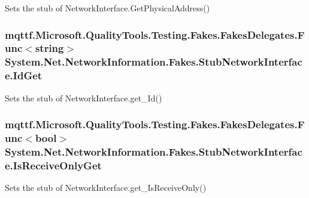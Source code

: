 Sets the stub of Network\-Interface.\-Get\-Physical\-Address()

\hypertarget{class_system_1_1_net_1_1_network_information_1_1_fakes_1_1_stub_network_interface_a1deac7c9af95c06b677cb0cdcbc3506c}{
\subsubsection[{Id\-Get}]{\setlength{\rightskip}{0pt plus 5cm}mqttf.\-Microsoft.\-Quality\-Tools.\-Testing.\-Fakes.\-Fakes\-Delegates.\-Func$<$string$>$ System.\-Net.\-Network\-Information.\-Fakes.\-Stub\-Network\-Interface.\-Id\-Get}}\label{class_system_1_1_net_1_1_network_information_1_1_fakes_1_1_stub_network_interface_a1deac7c9af95c06b677cb0cdcbc3506c}


Sets the stub of Network\-Interface.\-get\-\_\-\-Id()

\hypertarget{class_system_1_1_net_1_1_network_information_1_1_fakes_1_1_stub_network_interface_a7d20ee6914e892a56bf1f3bbf1751efc}{
\subsubsection[{Is\-Receive\-Only\-Get}]{\setlength{\rightskip}{0pt plus 5cm}mqttf.\-Microsoft.\-Quality\-Tools.\-Testing.\-Fakes.\-Fakes\-Delegates.\-Func$<$bool$>$ System.\-Net.\-Network\-Information.\-Fakes.\-Stub\-Network\-Interface.\-Is\-Receive\-Only\-Get}}\label{class_system_1_1_net_1_1_network_information_1_1_fakes_1_1_stub_network_interface_a7d20ee6914e892a56bf1f3bbf1751efc}


Sets the stub of Network\-Interface.\-get\-\_\-\-Is\-Receive\-Only()

